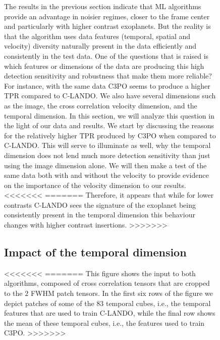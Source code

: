 \documentclass{aa}
\begin{document}
{{{\begin{figure}[t]
{The results in the previous section indicate that ML algorithms provide an advantage in noisier regimes, closer to the frame center and particularly with higher contrast exoplanets.
But the reality is that the algorithm uses data features (temporal, spatial and velocity) diversity naturally present in the data efficiently and consistently in the test data.
One of the questions that is raised is which features or dimensions of the data are producing this high detection sensitivity and robustness that make them more reliable?
For instance, with the same data C3PO seems to produce a higher TPR compared to C-LANDO.
We also have several dimensions such as the image, the cross correlation velocity dimension, and the temporal dimension.
In this section, we will analyze this question in the light of our data and results.
We start by discussing the reasons for the relatively higher TPR produced by C3PO when compared to C-LANDO.
This will serve to illuminate as well, why the temporal dimension does not lend much more detection sensitivity than just using the image dimension alone.
We will then make a test of the same data both with and without the velocity to provide evidence on the importance of the velocity dimension to our results.
<<<<<<<
=======
Therefore, it appears that while for lower contrasts C-LANDO sees the signature of the exoplanet being consistently present in the temporal dimension this behaviour changes with higher contrast insertions.
>>>>>>>

\subsection{Impact of the temporal dimension}
<<<<<<<
=======
This figure shows the input to both algorithms, composed of cross correlation tensors that are cropped to the $2$ FWHM patch tensors.
In the first six rows of the figure we depict patches of some of the $83$ temporal cubes, i.e., the temporal features that are used to train C-LANDO, while the final row shows the mean of these temporal cubes, i.e., the features used to train C3PO.
>>>>>>>

}
\end{figure}}}}
\end{document}

